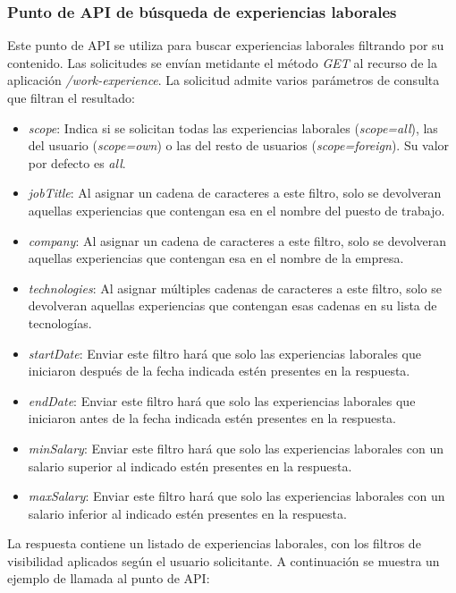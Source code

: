 \documentclass[a4paper, 12pt]{book}
\begin{document}
\subsubsection{Punto de API de búsqueda de experiencias laborales}
\label{subsec:get_work_experience}
Este punto de API se utiliza para buscar experiencias laborales filtrando por su contenido.
Las solicitudes se envían metidante el método \emph{GET} al recurso de la aplicación \emph{/work-experience}.
La solicitud admite varios parámetros de consulta que filtran el resultado:
		\begin{itemize}
		\item \emph{scope}: Indica si se solicitan todas las experiencias laborales (\emph{scope=all}), las del usuario (\emph{scope=own}) o las del resto de usuarios (\emph{scope=foreign}).
		Su valor por defecto es \emph{all}.
		\item \emph{jobTitle}: Al asignar un cadena de caracteres a este filtro, solo se devolveran aquellas experiencias que contengan esa en el nombre del puesto de trabajo.
		\item \emph{company}: Al asignar un cadena de caracteres a este filtro, solo se devolveran aquellas experiencias que contengan esa en el nombre de la empresa.
		\item \emph{technologies}: Al asignar múltiples cadenas de caracteres a este filtro, solo se devolveran aquellas experiencias que contengan esas cadenas en su lista de tecnologías.
		\item \emph{startDate}: Enviar este filtro hará que solo las experiencias laborales que iniciaron después de la fecha indicada estén presentes en la respuesta.
		\item \emph{endDate}: Enviar este filtro hará que solo las experiencias laborales que iniciaron antes de la fecha indicada estén presentes en la respuesta.
		\item \emph{minSalary}: Enviar este filtro hará que solo las experiencias laborales con un salario superior al indicado estén presentes en la respuesta.
		\item \emph{maxSalary}: Enviar este filtro hará que solo las experiencias laborales con un salario inferior al indicado estén presentes en la respuesta.
		\end{itemize}
La respuesta contiene un listado de experiencias laborales, con los filtros de visibilidad aplicados según el usuario solicitante.
A continuación se muestra un ejemplo de llamada al punto de API:
\end{document}
